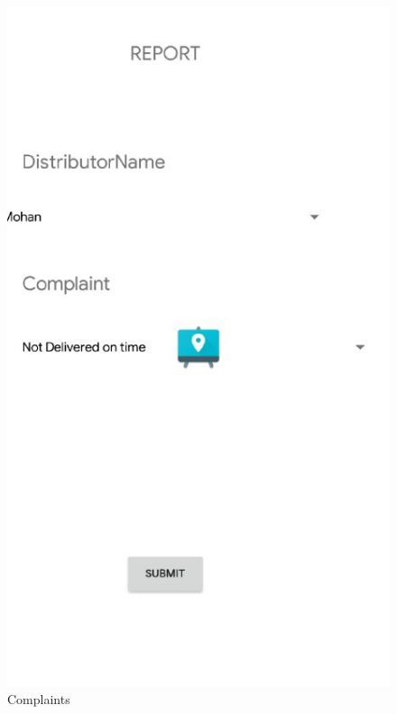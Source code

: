 \begin{figure}[h]
  \begin{center}
\includegraphics[scale=0.6]{3/nine.jpeg}
\caption{Complaints}
\label{fig:two}
\end{center}
\end{figure}


